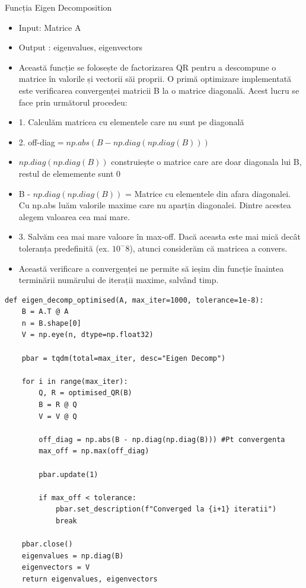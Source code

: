 \documentclass[12pt]{article}
\begin{document}
Funcția Eigen Decomposition
\begin{itemize}
    \item Input: Matrice A
    \item Output : eigenvalues, eigenvectors
    \item Această funcție se folosește de factorizarea QR pentru a descompune o matrice în valorile și vectorii săi proprii. O primă optimizare implementată este verificarea convergenței matricii B la o matrice diagonală. Acest lucru se face prin următorul procedeu:
    \item 1. Calculăm matricea cu elementele care nu sunt pe diagonală
    \item 2. off-diag$=np.abs(B-np.diag(np.diag(B)))$
    \item $np.diag(np.diag(B))$ construiește o matrice care are doar diagonala lui B, restul de elememente sunt 0
    \item B - $np.diag(np.diag(B))$ = Matrice cu elementele din afara diagonalei. Cu np.abs luăm valorile maxime care nu aparțin diagonalei. Dintre acestea alegem valoarea cea mai mare.
    \item 3. Salvăm cea mai mare valoare în max-off. Dacă aceasta este mai mică decât toleranța predefinită (ex. $10^-8$), atunci considerăm că matricea a convers.
    \item Această verificare a convergenței ne permite să ieșim din funcție înaintea terminării numărului de iterații maxime, salvând timp.
\end{itemize}

\begin{lstlisting}
def eigen_decomp_optimised(A, max_iter=1000, tolerance=1e-8):
    B = A.T @ A
    n = B.shape[0]
    V = np.eye(n, dtype=np.float32)

    pbar = tqdm(total=max_iter, desc="Eigen Decomp")

    for i in range(max_iter):
        Q, R = optimised_QR(B)
        B = R @ Q
        V = V @ Q

        off_diag = np.abs(B - np.diag(np.diag(B))) #Pt convergenta
        max_off = np.max(off_diag)

        pbar.update(1)
        
        if max_off < tolerance: 
            pbar.set_description(f"Converged la {i+1} iteratii")
            break
    
    pbar.close()
    eigenvalues = np.diag(B)
    eigenvectors = V
    return eigenvalues, eigenvectors
\end{lstlisting}
\end{document}
